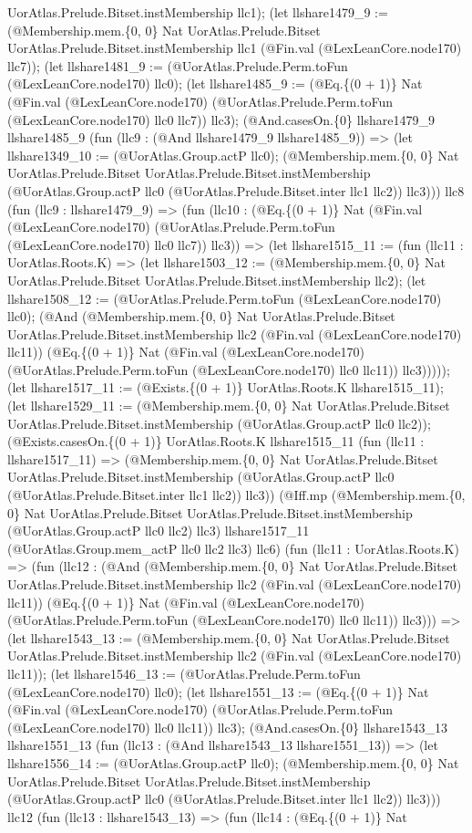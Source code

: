 \documentclass[11pt]{article}
\begin{document}
UorAtlas.Prelude.Bitset.instMembership llc1); (let llshare1479\_9 := (@Membership.mem.\{0, 0\} Nat UorAtlas.Prelude.Bitset UorAtlas.Prelude.Bitset.instMembership llc1 (@Fin.val (@LexLeanCore.node170) llc7)); (let llshare1481\_9 := (@UorAtlas.Prelude.Perm.toFun (@LexLeanCore.node170) llc0); (let llshare1485\_9 := (@Eq.\{(0 + 1)\} Nat (@Fin.val (@LexLeanCore.node170) (@UorAtlas.Prelude.Perm.toFun (@LexLeanCore.node170) llc0 llc7)) llc3); (@And.casesOn.\{0\} llshare1479\_9 llshare1485\_9 (fun (llc9 : (@And llshare1479\_9 llshare1485\_9)) => (let llshare1349\_10 := (@UorAtlas.Group.actP llc0); (@Membership.mem.\{0, 0\} Nat UorAtlas.Prelude.Bitset UorAtlas.Prelude.Bitset.instMembership (@UorAtlas.Group.actP llc0 (@UorAtlas.Prelude.Bitset.inter llc1 llc2)) llc3))) llc8 (fun (llc9 : llshare1479\_9) => (fun (llc10 : (@Eq.\{(0 + 1)\} Nat (@Fin.val (@LexLeanCore.node170) (@UorAtlas.Prelude.Perm.toFun (@LexLeanCore.node170) llc0 llc7)) llc3)) => (let llshare1515\_11 := (fun (llc11 : UorAtlas.Roots.K) => (let llshare1503\_12 := (@Membership.mem.\{0, 0\} Nat UorAtlas.Prelude.Bitset UorAtlas.Prelude.Bitset.instMembership llc2); (let llshare1508\_12 := (@UorAtlas.Prelude.Perm.toFun (@LexLeanCore.node170) llc0); (@And (@Membership.mem.\{0, 0\} Nat UorAtlas.Prelude.Bitset UorAtlas.Prelude.Bitset.instMembership llc2 (@Fin.val (@LexLeanCore.node170) llc11)) (@Eq.\{(0 + 1)\} Nat (@Fin.val (@LexLeanCore.node170) (@UorAtlas.Prelude.Perm.toFun (@LexLeanCore.node170) llc0 llc11)) llc3))))); (let llshare1517\_11 := (@Exists.\{(0 + 1)\} UorAtlas.Roots.K llshare1515\_11); (let llshare1529\_11 := (@Membership.mem.\{0, 0\} Nat UorAtlas.Prelude.Bitset UorAtlas.Prelude.Bitset.instMembership (@UorAtlas.Group.actP llc0 llc2)); (@Exists.casesOn.\{(0 + 1)\} UorAtlas.Roots.K llshare1515\_11 (fun (llc11 : llshare1517\_11) => (@Membership.mem.\{0, 0\} Nat UorAtlas.Prelude.Bitset UorAtlas.Prelude.Bitset.instMembership (@UorAtlas.Group.actP llc0 (@UorAtlas.Prelude.Bitset.inter llc1 llc2)) llc3)) (@Iff.mp (@Membership.mem.\{0, 0\} Nat UorAtlas.Prelude.Bitset UorAtlas.Prelude.Bitset.instMembership (@UorAtlas.Group.actP llc0 llc2) llc3) llshare1517\_11 (@UorAtlas.Group.mem\_actP llc0 llc2 llc3) llc6) (fun (llc11 : UorAtlas.Roots.K) => (fun (llc12 : (@And (@Membership.mem.\{0, 0\} Nat UorAtlas.Prelude.Bitset UorAtlas.Prelude.Bitset.instMembership llc2 (@Fin.val (@LexLeanCore.node170) llc11)) (@Eq.\{(0 + 1)\} Nat (@Fin.val (@LexLeanCore.node170) (@UorAtlas.Prelude.Perm.toFun (@LexLeanCore.node170) llc0 llc11)) llc3))) => (let llshare1543\_13 := (@Membership.mem.\{0, 0\} Nat UorAtlas.Prelude.Bitset UorAtlas.Prelude.Bitset.instMembership llc2 (@Fin.val (@LexLeanCore.node170) llc11)); (let llshare1546\_13 := (@UorAtlas.Prelude.Perm.toFun (@LexLeanCore.node170) llc0); (let llshare1551\_13 := (@Eq.\{(0 + 1)\} Nat (@Fin.val (@LexLeanCore.node170) (@UorAtlas.Prelude.Perm.toFun (@LexLeanCore.node170) llc0 llc11)) llc3); (@And.casesOn.\{0\} llshare1543\_13 llshare1551\_13 (fun (llc13 : (@And llshare1543\_13 llshare1551\_13)) => (let llshare1556\_14 := (@UorAtlas.Group.actP llc0); (@Membership.mem.\{0, 0\} Nat UorAtlas.Prelude.Bitset UorAtlas.Prelude.Bitset.instMembership (@UorAtlas.Group.actP llc0 (@UorAtlas.Prelude.Bitset.inter llc1 llc2)) llc3))) llc12 (fun (llc13 : llshare1543\_13) => (fun (llc14 : (@Eq.\{(0 + 1)\} Nat 
\end{document}
